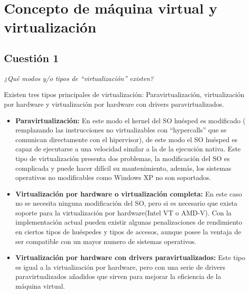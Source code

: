 



\maketitle %
\newpage %
\tableofcontents %
\listoffigures
\listoftables
\newpage

\section{Concepto de máquina virtual y virtualización}
\subsection{Cuestión 1}
\textit{¿Qué modos y/o tipos de “virtualización” existen? } \newline

Existen tres tipos principales de virtualización: Paravirtualización, virtualización por hardware  y virtualización por hardware con drivers paravirtualizados.


\begin{itemize}
    \item \textbf{Paravirtualización:} En este modo el kernel del SO huésped es modificado ( remplazando las instrucciones no virtualizables con ``hypercalls'' que se comunican directamente con el hipervisor),
de este modo el SO huésped es capaz de ejecutarse a una velocidad similar a la de la ejecución nativa. Este tipo de virtualización presenta dos problemas, la modificación del SO es complicada y puede hacer difícil su mantenimiento, además, los sistemas operativos no modificables como Windows XP no son soportados. \cite{vmware} \cite{vmoracle}

    \item \textbf{Virtualización por hardware o virtualización completa:} En este caso no se necesita ninguna modificación del SO, pero si es necesario que exista soporte para la virtualización por hardware(Intel VT o AMD-V). Con la implementación actual pueden existir algunas penalizaciones de rendimiento en ciertos tipos de huéspedes y tipos de accesos, aunque posee la ventaja de ser compatible con un mayor numero de sistemas operativos. \cite{vmoracle}

    \item \textbf{Virtualización por hardware con drivers paravirtualizados:} Este tipo es igual a la virtualización por hardware, pero con una serie de drivers paravirtualizados añadidos que sirven para mejorar la eficiencia de la máquina virtual.\cite{vmoracle}
\end{itemize}


